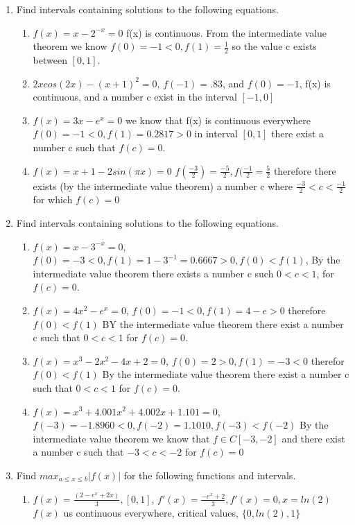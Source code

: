 \documentclass{article}
\begin{document}
\begin{enumerate}
\begin{enumerate}
    \end{enumerate}
    \item Find intervals containing solutions to the following equations. 
    \begin{enumerate}
        \item $f(x) = x - 2^{-x} = 0$ f(x) is continuous. From the intermediate value theorem we know $f(0) = -1 < 0, f(1) = \frac{1}{2}$ so the value c exists between $[0,1]$.
        \item $2xcos(2x) - (x+1)^2 = 0$, $f(-1) = .83$, and $f(0) = -1$, f(x) is continuous, and a number c exist in the interval $[-1,0]$
        \item $f(x) = 3x-e^{x} = 0$ we know that f(x) is continuous everywhere $f(0) = -1 < 0, f(1) = 0.2817 > 0$ in interval $[0,1]$ there exist a number c such that $f(c) = 0$.
        \item $f(x) = x + 1 - 2sin(\pi x) = 0$ $f(\frac{-3}{2}) = \frac{-5}{2}, f(\frac{-1}{2} = \frac{5}{2}$ therefore there exists (by the intermediate value theorem) a number c where $\frac{-3}{2} < c < \frac{-1}{2}$ for which $f(c) = 0$
    \end{enumerate}
    \item Find intervals containing solutions to the following equations.
    \begin{enumerate}
        \item $f(x) = x-3^{-x} = 0$, $f(0) = -3 < 0, f(1) = 1 - 3^{-1} = 0.6667 > 0, f(0) < f(1)$, By the intermediate value theorem there exists a number c such $0 < c < 1$, for $f(c) = 0$.
        \item $f(x) = 4x^2-e^{x} = 0$, $f(0) = -1 < 0, f(1) = 4-e > 0$ therefore $f(0) < f(1)$ BY the intermediate value theorem there exist a number c such that $0 < c < 1$ for $f(c) = 0$.
        \item $f(x) = x^3-2x^2-4x+2 = 0$, $f(0) = 2 > 0, f(1) = -3 < 0$ therefor $f(0) < f(1)$ By the intermediate value theorem there exist a number c such that $0 < c < 1$ for $f(c) = 0$.
        \item $f(x) = x^3+4.001x^2 + 4.002x + 1.101 = 0$, $f(-3) = -1.8960 < 0, f(-2) = 1.1010, f(-3) < f(-2) $ By the intermediate value theorem we know that $f \in C[-3,-2]$ and there exist a number c such that $-3 < c < -2$ for $f(c) = 0$
    \end{enumerate}
    \item Find $max_{a \leq x \leq b}|f(x)|$ for the following functions and intervals.
    \begin{enumerate}
        \item $f(x) = \frac{(2-e^{x}+2x)}{3}, [0,1]$, $f'(x) = \frac{-e^{x} + 2}{3}, f'(x) = 0, x = ln(2) $ $f(x)$ us continuous everywhere, critical values, $\{0,ln(2),1\}$

\end{enumerate}
\end{enumerate}
\end{document}
